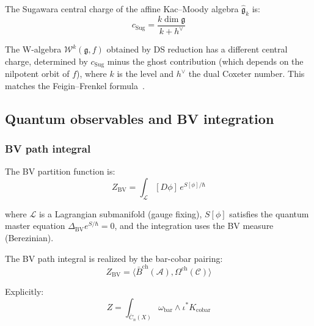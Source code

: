 \begin{theorem}
\label{thm:central-charge-from-4d}
The Sugawara central charge of the affine Kac--Moody algebra $\widehat{\mathfrak{g}}_k$ is:
\[c_{\mathrm{Sug}} = \frac{k \dim \mathfrak{g}}{k + h^\vee}\]

The W-algebra $\mathcal{W}^k(\mathfrak{g}, f)$ obtained by DS reduction has a different central charge, determined by $c_{\mathrm{Sug}}$ minus the ghost contribution (which depends on the nilpotent orbit of $f$), where $k$ is the level and $h^\vee$ the dual Coxeter number. This matches the Feigin--Frenkel formula~\cite{Feigin-Frenkel}.
\end{theorem}

\subsection{Quantum observables and BV integration}

\subsubsection{BV path integral}

\begin{definition}
The BV partition function is:
\[Z_{\text{BV}} = \int_{\mathcal{L}} [D\phi] \, e^{S[\phi]/\hbar}\]

where $\mathcal{L}$ is a Lagrangian submanifold (gauge fixing), $S[\phi]$ satisfies the quantum master equation $\Delta_{\text{BV}} e^{S/\hbar} = 0$, and the integration uses the BV measure (Berezinian).
\end{definition}

\begin{remark}
\label{rem:bv-integration-bar-cobar}
The BV path integral is realized by the bar-cobar pairing:
\[Z_{\text{BV}} = \langle \bar{B}^{\text{ch}}(\mathcal{A}),
\Omega^{\text{ch}}(\mathcal{C}) \rangle\]

Explicitly:
\[Z = \int_{\overline{C}_n(X)} \omega_{\text{bar}} \wedge \iota^* K_{\text{cobar}}\]
\end{remark}

